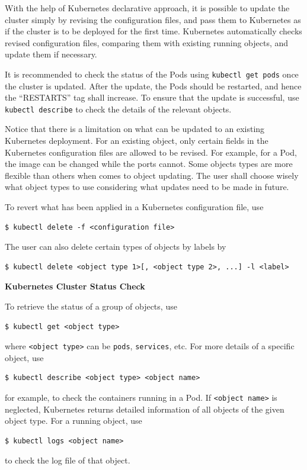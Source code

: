 With the help of Kubernetes declarative approach, it is possible to update the cluster simply by revising the configuration files, and pass them to Kubernetes as if the cluster is to be deployed for the first time. Kubernetes automatically checks revised configuration files, comparing them with existing running objects, and update them if necessary.

It is recommended to check the status of the Pods using \verb|kubectl get pods| once the cluster is updated. After the update, the Pods should be restarted, and hence the ``RESTARTS'' tag shall increase. To ensure that the update is successful, use \verb|kubectl describe| to check the details of the relevant objects.

Notice that there is a limitation on what can be updated to an existing Kubernetes deployment. For an existing object, only certain fields in the Kubernetes configuration files are allowed to be revised. For example, for a Pod, the image can be changed while the ports cannot. Some objects types are more flexible than others when comes to object updating. The user shall choose wisely what object types to use considering what updates need to be made in future.

To revert what has been applied in a Kubernetes configuration file, use
\begin{lstlisting}
$ kubectl delete -f <configuration file>
\end{lstlisting}
The user can also delete certain types of objects by labels by
\begin{lstlisting}
$ kubectl delete <object type 1>[, <object type 2>, ...] -l <label>
\end{lstlisting}

\vspace{0.1in}
\noindent \textbf{Kubernetes Cluster Status Check}
\vspace{0.1in}

To retrieve the status of a group of objects, use
\begin{lstlisting}
$ kubectl get <object type>
\end{lstlisting}
where \verb|<object type>| can be \verb|pods|, \verb|services|, etc. For more details of a specific object, use
\begin{lstlisting}
$ kubectl describe <object type> <object name>
\end{lstlisting}
for example, to check the containers running in a Pod. If \verb|<object name>| is neglected, Kubernetes returns detailed information of all objects of the given object type. For a running object, use
\begin{lstlisting}
$ kubectl logs <object name>
\end{lstlisting}
to check the log file of that object.

